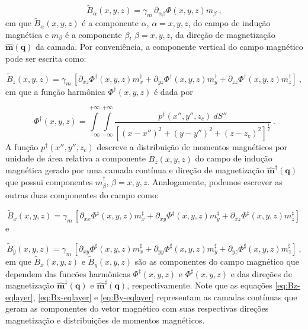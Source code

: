 \begin{equation}
\tilde{B}_{\alpha}(x, y, z) = \gamma_{m} \, \partial_{\alpha\beta} \Phi(x, y, z) m_{\beta} \: ,
\label{eq:B-eqlayer-notacao-einstein}
\end{equation}
em que $\tilde{B}_{\alpha} (x,y,z)$ é a componente $\alpha$, $\alpha=x,y,z$, do campo de indução magnética e $m_{\beta}$ é a componente $\beta$, $\beta =x,y,z$, da direção de magnetização $\hat{\mathbf{m}} (\mathbf{q})$ da camada. Por conveniência, a componente vertical do campo magnético pode ser escrita como:  

\begin{equation}
\tilde{B}_{z}(x, y, z) = \gamma_{m} \,[ \partial_{xz} \Phi^{\dagger}(x, y, z) m_{x}^{\dagger} + \partial_{yz} \Phi^{\dagger}(x, y, z) m_{y}^{\dagger} + \partial_{zz} \Phi^{\dagger}(x, y, z) m_{z}^{\dagger} ]  \: ,
\label{eq:Bz-eqlayer}
\end{equation}
em que a função harmônica $\Phi^{\dagger}(x, y, z)$ é dada por 

\begin{equation}
\Phi^{\dagger}(x, y, z) = \int\limits_{-\infty}^{+\infty}\int\limits_{-\infty}^{+\infty}
\frac{p^{\dagger}(x'', y'', z_{c}) \: dS''}
{\left[ (x-x'')^2 + (y-y'')^2 + (z-z_{c})^2 \right]^{\frac{1}{2}}} \: .
\label{eq:Phi-integral-superficie-Bz}
\end{equation}
A função $p^{\dagger}(x'', y'', z_{c})$ descreve a distribuição de momentos magnéticos por unidade de área relativa a componente $\tilde{B}_{z}(x, y, z)$ do campo de indução magnética gerado por uma camada contínua e direção de magnetização $\hat{\mathbf{m}}^{\dagger}(\mathbf{q})$ que possui componentes $m_{\beta}^{\dagger}$, $\beta = x,y,z$. Analogamente, podemos escrever as outras duas componentes do campo como:

\begin{equation}
\tilde{B}_{x}(x, y, z) = \gamma_{m} \, [\partial_{xx} \Phi^{\ddagger}(x, y, z) m_{x}^{\ddagger} + \partial_{xy} \Phi^{\ddagger}(x, y, z) m_{y}^{\ddagger} + \partial_{xz} \Phi^{\ddagger}(x, y, z) m_{z}^{\ddagger}]   \: 
\label{eq:Bx-eqlayer}
\end{equation}
e 

\begin{equation}
\tilde{B}_{y}(x, y, z) = \gamma_{m} \, [\partial_{xy} \Phi^{\sharp}(x, y, z) m_{x}^{\sharp} + \partial_{yy} \Phi^{\sharp}(x, y, z) m_{y}^{\sharp} + \partial_{yz} \Phi^{\sharp}(x, y, z) m_{z}^{\sharp}]   \: ,
\label{eq:By-eqlayer}
\end{equation}
em que $\tilde{B}_{x} (x,y,z)$ e $\tilde{B}_{y} (x,y,z)$ são as componentes do campo magnético que dependem das funcões harmônicas $\Phi^{\ddagger}(x, y, z)$ e $\Phi^{\sharp}(x, y, z)$ e das direções de magnetização $\hat{\mathbf{m}}^{\ddagger}(\mathbf{q})$ e $\hat{\mathbf{m}}^{\sharp}(\mathbf{q})$, respectivamente. Note que as equações \ref{eq:Bz-eqlayer}, \ref{eq:Bx-eqlayer} e \ref{eq:By-eqlayer} representam as camadas contínuas que geram as componentes do vetor magnético com suas respectivas direções magnetização e distribuições de momentos magnéticos. 

